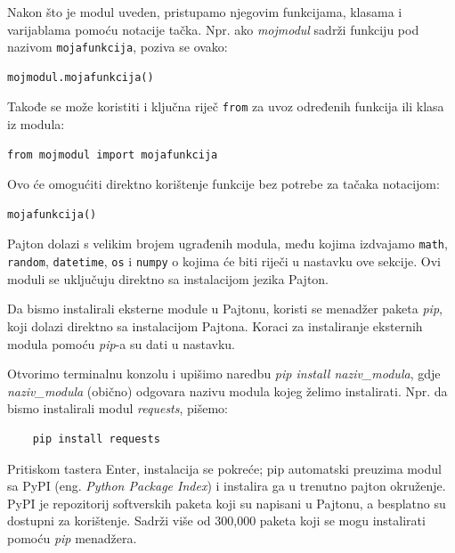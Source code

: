 Nakon što je modul uveden, pristupamo njegovim funkcijama, klasama i varijablama pomoću notacije tačka. Npr. ako \textit{mojmodul} sadrži funkciju pod nazivom \texttt{mojafunkcija}, poziva se ovako:
\begin{verbatim}
mojmodul.mojafunkcija()
\end{verbatim}

Takođe se može koristiti i ključna riječ \texttt{from} za uvoz određenih funkcija ili klasa iz modula:
\begin{verbatim}
from mojmodul import mojafunkcija
\end{verbatim}

Ovo će omogućiti direktno korištenje funkcije bez potrebe za tačaka notacijom:

\begin{verbatim}
mojafunkcija()

\end{verbatim}

Pajton dolazi s velikim brojem ugrađenih modula, među kojima izdvajamo \texttt{math}, \texttt{random}, \texttt{datetime}, \texttt{os} i \texttt{numpy} o kojima će biti riječi u nastavku ove sekcije. Ovi moduli se uključuju direktno sa instalacijom jezika Pajton.
 



Da bismo instalirali eksterne module u Pajtonu,   koristi se menadžer paketa \textit{pip}, koji dolazi direktno sa instalacijom Pajtona. Koraci za instaliranje eksternih modula pomoću \emph{pip}-a su dati u nastavku. 

Otvorimo terminalnu konzolu i upišimo naredbu \textit{pip install naziv\_modula}, gdje  \textit{naziv\_modula} (obično) odgovara nazivu  modula kojeg želimo instalirati. Npr. da bismo instalirali modul \textit{requests}, pišemo:
\begin{verbatim}
    pip install requests
\end{verbatim}

Pritiskom tastera Enter, instalacija se pokreće; pip automatski preuzima modul sa PyPI (eng. \textit{Python Package Index}) i instalira ga u trenutno pajton okruženje. PyPI je repozitorij softverskih paketa koji su napisani u Pajtonu, a besplatno su dostupni za korištenje. Sadrži više od 300,000 paketa koji se mogu instalirati pomoću \textit{pip} menadžera.


